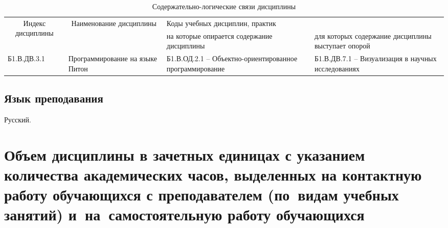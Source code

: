 \documentclass[a4paper,12pt]{article}
\begin{document}
  \begin{table}[H]
  \setlength\arraycolsep{3pt}
  \caption{Содержательно-логические связи дисциплины}
  \begin{tabular}{|l|p{18ex}|*{2}{p{23ex}|}}
  \hline
  \multicolumn{1}{|c|}{\multirow{2}{13ex}{\centering Индекс \linebreak дисциплины}} &
  \multicolumn{1}{c|}{\multirow{2}{18ex}{\centering Наименование \linebreak дисциплины}} & 
  \multicolumn{2}{p{46ex}|}{\centering Коды учебных дисциплин, практик} \\
  \cline{3-4}
   & & 
  \centering на которые опирается содержание дисциплины & 
  \centering\arraybackslash для которых содержание дисциплины выступает опорой
  \\ \hline
  Б1.В.ДВ.3.1 & Программирование на языке Питон 
  & 
  \raggedright
  
  Б1.В.ОД.2.1 -- Объектно-ориентированное программирование 
  & 
  \raggedright\arraybackslash
  
  Б1.В.ДВ.7.1 -- Визуализация в научных исследованиях 
  \\ \hline
  \end{tabular}
  \end{table}


\subsection{Язык преподавания} 
  Русский.
  



\newpage

\section{Объем дисциплины в зачетных единицах с указанием количества академических часов, выделенных на контактную работу обучающихся с преподавателем (по~видам учебных занятий) и~на~самостоятельную работу обучающихся}
\end{document}
